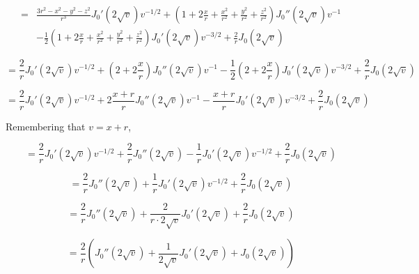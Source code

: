 \documentclass{article}
\begin{document}
\begin{equation*}
\begin{aligned}
=&\frac{3r^2-x^2-y^2-z^2}{r^3} J_0'(2\sqrt{v}) v^{-1/2} + (1+2\frac{x}{r} +\frac{x^2}{r^2} + \frac{y^2}{r^2} + \frac{z^2}{r^2}) J_0''(2\sqrt{v}) v^{-1} \\
&- \frac{1}{2} (1+2\frac{x}{r} +\frac{x^2}{r^2}+ \frac{y^2}{r^2} + \frac{z^2}{r^2}) J_0'(2\sqrt{v}) v^{-3/2}
+ \frac{2}{r} J_0(2\sqrt{v})
\end{aligned}
\end{equation*}

\begin{equation*}
=\frac{2}{r} J_0'(2\sqrt{v}) v^{-1/2} + (2+2\frac{x}{r}) J_0''(2\sqrt{v}) v^{-1} - \frac{1}{2} (2+2\frac{x}{r}) J_0'(2\sqrt{v}) v^{-3/2} + \frac{2}{r} J_0(2\sqrt{v})
\end{equation*}

\begin{equation*}
=\frac{2}{r} J_0'(2\sqrt{v}) v^{-1/2} + 2\frac{x+r}{r} J_0''(2\sqrt{v}) v^{-1} - \frac{x+r}{r} J_0'(2\sqrt{v}) v^{-3/2}
+ \frac{2}{r} J_0(2\sqrt{v})
\end{equation*}

Remembering that $v=x+r$,


\begin{equation*}
=\frac{2}{r} J_0'(2\sqrt{v}) v^{-1/2} + \frac{2}{r} J_0''(2\sqrt{v}) - \frac{1}{r} J_0'(2\sqrt{v}) v^{-1/2}
+ \frac{2}{r} J_0(2\sqrt{v})
\end{equation*}

\begin{equation*}
=\frac{2}{r} J_0''(2\sqrt{v}) + \frac{1}{r} J_0'(2\sqrt{v}) v^{-1/2} + \frac{2}{r} J_0(2\sqrt{v})
\end{equation*}

\begin{equation*}
=\frac{2}{r} J_0''(2\sqrt{v}) + \frac{2}{r\cdot2\sqrt{v}} J_0'(2\sqrt{v}) + \frac{2}{r} J_0(2\sqrt{v})
\end{equation*}

\begin{equation}
\label{last eq in derivation}
=\frac{2}{r} \left( J_0''(2\sqrt{v}) + \frac{1}{2\sqrt{v}} J_0'(2\sqrt{v}) + J_0(2\sqrt{v})\right)
\end{equation}
\end{document}
